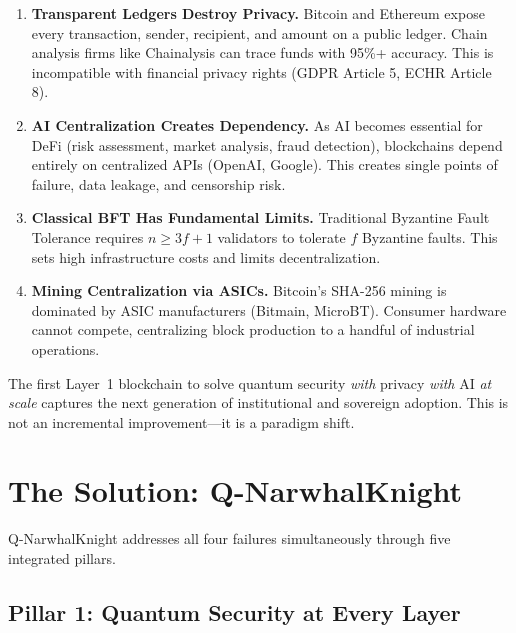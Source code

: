 \documentclass[11pt,a4paper]{article}
\begin{document}
\begin{enumerate}[leftmargin=1.5em]
    \item \textbf{Transparent Ledgers Destroy Privacy.} Bitcoin and Ethereum expose every transaction, sender, recipient, and amount on a public ledger. Chain analysis firms like Chainalysis can trace funds with 95\%+ accuracy. This is incompatible with financial privacy rights (GDPR Article 5, ECHR Article 8).

    \item \textbf{AI Centralization Creates Dependency.} As AI becomes essential for DeFi (risk assessment, market analysis, fraud detection), blockchains depend entirely on centralized APIs (OpenAI, Google). This creates single points of failure, data leakage, and censorship risk.

    \item \textbf{Classical BFT Has Fundamental Limits.} Traditional Byzantine Fault Tolerance requires $n \geq 3f + 1$ validators to tolerate $f$ Byzantine faults. This sets high infrastructure costs and limits decentralization.

    \item \textbf{Mining Centralization via ASICs.} Bitcoin's SHA-256 mining is dominated by ASIC manufacturers (Bitmain, MicroBT). Consumer hardware cannot compete, centralizing block production to a handful of industrial operations.
\end{enumerate}

\begin{keyinsight}
The first Layer~1 blockchain to solve quantum security \textit{with} privacy \textit{with} AI \textit{at scale} captures the next generation of institutional and sovereign adoption. This is not an incremental improvement---it is a paradigm shift.
\end{keyinsight}

\section{The Solution: Q-NarwhalKnight}

Q-NarwhalKnight addresses all four failures simultaneously through five integrated pillars.

\subsection{Pillar 1: Quantum Security at Every Layer}
\end{document}
